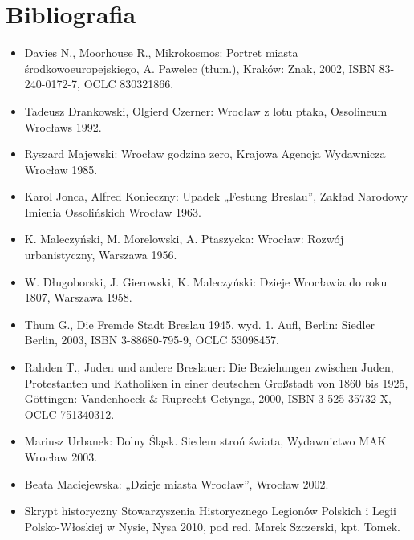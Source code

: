 \documentclass{article}
\begin{document}
\section{Bibliografia}
\begin{itemize}
    \item Davies N., Moorhouse R., Mikrokosmos: Portret miasta środkowoeuropejskiego, A. Pawelec (tłum.), Kraków: Znak, 2002, ISBN 83-240-0172-7, OCLC 830321866.
    \item Tadeusz Drankowski, Olgierd Czerner: Wrocław z lotu ptaka, Ossolineum Wrocławs 1992.
    \item Ryszard Majewski: Wrocław godzina zero, Krajowa Agencja Wydawnicza Wrocław 1985.
    \item Karol Jonca, Alfred Konieczny: Upadek „Festung Breslau”, Zakład Narodowy Imienia Ossolińskich Wrocław 1963.
    \item K. Maleczyński, M. Morelowski, A. Ptaszycka: Wrocław: Rozwój urbanistyczny, Warszawa 1956.
    \item W. Długoborski, J. Gierowski, K. Maleczyński: Dzieje Wrocławia do roku 1807, Warszawa 1958.
    \item Thum G., Die Fremde Stadt Breslau 1945, wyd. 1. Aufl, Berlin: Siedler Berlin, 2003, ISBN 3-88680-795-9, OCLC 53098457.
    \item Rahden T., Juden und andere Breslauer: Die Beziehungen zwischen Juden, Protestanten und Katholiken in einer deutschen Großstadt von 1860 bis 1925, Göttingen: Vandenhoeck & Ruprecht Getynga, 2000, ISBN 3-525-35732-X, OCLC 751340312.
    \item Mariusz Urbanek: Dolny Śląsk. Siedem stroń świata, Wydawnictwo MAK Wrocław 2003.
    \item Beata Maciejewska: „Dzieje miasta Wrocław”, Wrocław 2002.
    \item Skrypt historyczny Stowarzyszenia Historycznego Legionów Polskich i Legii Polsko-Włoskiej w Nysie, Nysa 2010, pod red. Marek Szczerski, kpt. Tomek.
\end{itemize}
\end{document}
